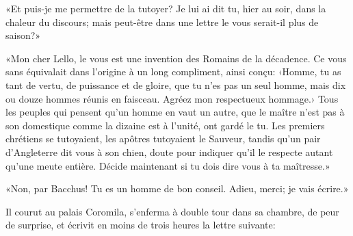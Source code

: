 «Et puis-je me permettre de la tutoyer? Je lui ai dit tu, hier au soir,
dans la chaleur du discours; mais peut-être dans une lettre le vous
serait-il plus de saison?»

«Mon cher Lello, le vous est une invention des Romains de la décadence.
Ce vous sans équivalait dans l'origine à un long compliment, ainsi
conçu: ‹Homme, tu as tant de vertu, de puissance et de gloire, que tu
n'es pas un seul homme, mais dix ou douze hommes réunis en faisceau.
Agréez mon respectueux hommage.› Tous les peuples qui pensent qu'un
homme en vaut un autre, que le maître n'est pas à son domestique comme
la dizaine est à l'unité, ont gardé le tu. Les premiers chrétiens se
tutoyaient, les apôtres tutoyaient le Sauveur, tandis qu'un pair
d'Angleterre dit vous à son chien, doute pour indiquer qu'il le respecte
autant qu'une meute entière. Décide maintenant si tu dois dire vous à ta
maîtresse.»

«Non, par Bacchus! Tu es un homme de bon conseil. Adieu, merci; je vais
écrire.»

Il courut au palais Coromila, s'enferma à double tour dans sa chambre,
de peur de surprise, et écrivit en moins de trois heures la lettre
suivante:

